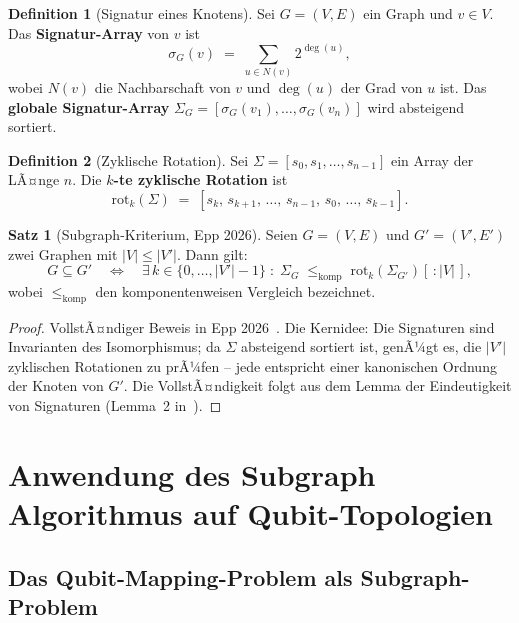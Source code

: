 ﻿\documentclass[a4paper,12pt]{article}
\theoremstyle{definition}
\newtheorem{definition}{Definition}
\newtheorem{satz}{Satz}
\begin{document}
\begin{definition}[Signatur eines Knotens]
\label{def:signature}
Sei $G = (V, E)$ ein Graph und $v \in V$. Das \textbf{Signatur-Array} von $v$ ist
\[
  \sigma_G(v) \;=\; \sum_{u \in N(v)} 2^{\deg(u)},
\]
wobei $N(v)$ die Nachbarschaft von $v$ und $\deg(u)$ der Grad von $u$ ist. Das
\textbf{globale Signatur-Array} $\Sigma_G = [\sigma_G(v_1),\ldots,\sigma_G(v_n)]$
wird absteigend sortiert.
\end{definition}

\begin{definition}[Zyklische Rotation]
\label{def:rotation}
Sei $\Sigma = [s_0, s_1, \ldots, s_{n-1}]$ ein Array der LÃ¤nge $n$. Die
\textbf{$k$-te zyklische Rotation} ist
\[
  \mathrm{rot}_k(\Sigma) \;=\; [s_k,\, s_{k+1},\, \ldots,\, s_{n-1},\, s_0,\,
  \ldots,\, s_{k-1}].
\]
\end{definition}

\begin{satz}[Subgraph-Kriterium, Epp 2026]
\label{satz:subgraph_kriterium}
Seien $G = (V,E)$ und $G' = (V',E')$ zwei Graphen mit $|V| \leq |V'|$. Dann gilt:
\[
  G \subseteq G' \quad\Longleftrightarrow\quad
  \exists\, k \in \{0,\ldots,|V'|-1\} \;:\;
  \Sigma_G \;\leq_\text{komp}\; \mathrm{rot}_k(\Sigma_{G'})[\,:\!|V|\,],
\]
wobei $\leq_\text{komp}$ den komponentenweisen Vergleich bezeichnet.
\end{satz}

\begin{proof}
VollstÃ¤ndiger Beweis in Epp 2026~\cite{epp2026subgraph}. Die Kernidee: Die
Signaturen sind Invarianten des Isomorphismus; da $\Sigma$ absteigend sortiert ist,
genÃ¼gt es, die $|V'|$ zyklischen Rotationen zu prÃ¼fen -- jede entspricht einer
kanonischen Ordnung der Knoten von $G'$. Die VollstÃ¤ndigkeit folgt aus dem Lemma der
Eindeutigkeit von Signaturen (Lemma~2 in~\cite{epp2026subgraph}).
\end{proof}

\section{Anwendung des Subgraph Algorithmus auf Qubit-Topologien}
\label{sec:mapping}

\subsection{Das Qubit-Mapping-Problem als Subgraph-Problem}
\end{document}
